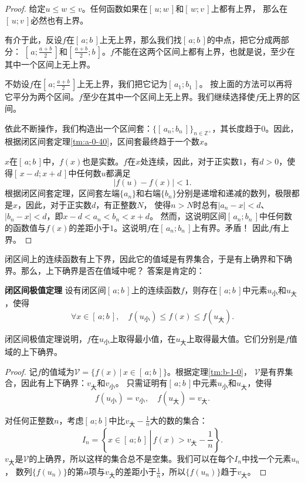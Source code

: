 \documentclass[12pt,UTF8]{ctexbook}
\begin{document}
\begin{appendix}
\begin{proof}
    给定$u \leqslant w \leqslant v$。任何函数如果在$[\,u; w\,]$和$[\,w; v\,]$上都有上界，
    那么在$[\,u; v\,]$必然也有上界。

    有介于此，反设$f$在$[\,a; b\,]$上无上界，那么我们找$[\,a; b\,]$的中点，把它分成两部分：
    $\left[\,a;\frac{a+b}{2}\,\right]$和$\left[\,\frac{a+b}{2}; b\,\right]$。$f$不能在这两个区间上都有上界，也就是说，至少在其中一个区间上无上界。

    不妨设$f$在$\left[\,a;\frac{a+b}{2}\,\right]$上无上界，我们把它记为$[\,a_1; b_1\,]$。
    按上面的方法可以再将它平分为两个区间。$f$至少在其中一个区间上无上界。我们继续选择使$f$无上界的区间。

    依此不断操作，我们构造出一个区间套：$\{[\,a_n;b_n\,]\}_{n\in\mathbb{Z}^+}$，其长度趋于$0$。因此，根据闭区间套定理\ref{tm:a-0-40}，区间套最终趋于一个数$x$。

    $x$在$[\,a; b\,]$中，$f(x)$也是实数。$f$在$x$处连续，因此，对于正实数$1$，有$d>0$，使得$[\,x-d;x+d\,]$中任何数$u$都满足
    $$ |f(u) - f(x)| < 1.$$
    根据闭区间套定理，区间套左端$\{a_n\}$和右端$\{b_n\}$分别是递增和递减的数列，极限都是$x$，因此，对于正实数$d$，有正整数$N$，
    使得$n>N$时总有$|a_n - x| < d$、$|b_n - x| < d$，即$x - d < a_n < b_n < x+d$。
    然而，这说明区间$[\,a_n;b_n\,]$中任何数的函数值与$f(x)$的差距小于$1$。这说明$f$在$[\,a_n;b_n\,]$上有界。矛盾！
    因此$f$有上界。

\end{proof}

闭区间上的连续函数有上下界，因此它的值域是有界集合，于是有上确界和下确界。那么，上下确界是否在值域中呢？
答案是肯定的：
\begin{tm}{\textbf{闭区间极值定理}}\label{tm:b-1-5}
    设有闭区间$[\,a; b\,]$上的连续函数$f$，则存在$[\,a;b\,]$中元素$u_{\text{小}}$和$u_{\text{大}}$，使得
    $$ \forall x\in[\,a;b\,], \quad f(u_{\text{小}}) \leqslant f(x) \leqslant f(u_{\text{大}}).$$
\end{tm}
闭区间极值定理说明，$f$在$u_{\text{小}}$上取得最小值，在$u_{\text{大}}$上取得最大值。它们分别是$f$值域的上下确界。
\begin{proof}
    记$f$的值域为$\mathcal{V} = \{f(x) \, | \, x\in[\,a;b\,]\}$。根据定理\ref{tm:b-1-0}，
    $\mathcal{V}$是有界集合，因此有上下确界：$v_{\text{大}}$和$v_{\text{小}}$。
    只需证明有$[\,a;b\,]$中元素$u_{\text{小}}$和$u_{\text{大}}$，使得
    $$ f(u_{\text{小}}) = v_{\text{小}} , \quad f(u_{\text{大}}) = v_{\text{大}}.$$

    对任何正整数$n$，考虑$[\,a; b\,]$中比$v_{\text{大}} - \frac{1}{n}$大的数的集合：
    $$I_n = \left\{ x\in[\,a;b\,] \, \left| \, f(x) > v_{\text{大}} - \frac{1}{n} \right.\right\}.$$
    $v_{\text{大}}$是$\mathcal{V}$的上确界，所以这样的集合总不是空集。我们可以在每个$I_n$中找一个元素$u_n$，
    数列$\{f(u_n)\}$的第$n$项与$v_{\text{大}}$的差距小于$\frac{1}{n}$，所以$\{f(u_n)\}$趋于$v_{\text{大}}$。


\end{proof}
\end{appendix}
\end{document}
